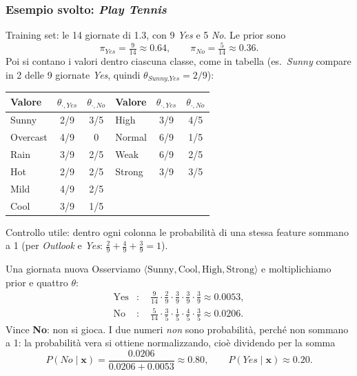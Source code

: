 \documentclass[12pt]{extarticle}
\begin{document}
\subsubsection{Esempio svolto: \textit{Play Tennis}}

\noindent Training set: le 14 giornate di 1.3, con 9 \textit{Yes} e 5 \textit{No}. Le prior sono
\[
\pi_{\textit{Yes}} = \tfrac{9}{14}\approx 0.64,
\qquad
\pi_{\textit{No}} = \tfrac{5}{14}\approx 0.36 .
\]
Poi si contano i valori dentro ciascuna classe, come in tabella (es.\ \textit{Sunny} compare in 2 delle 9 giornate \textit{Yes}, quindi $\theta_{\textit{Sunny},\textit{Yes}}=2/9$):

\begin{center}
\small
\begin{tabular}{lcc|lcc}
    \toprule
    \textbf{Valore} & $\theta_{\cdot, Yes}$ & $\theta_{\cdot, No}$ & \textbf{Valore} & $\theta_{\cdot, Yes}$ & $\theta_{\cdot, No}$ \\
    \midrule
    Sunny    & 2/9 & 3/5 & High   & 3/9 & 4/5 \\
    Overcast & 4/9 & 0   & Normal & 6/9 & 1/5 \\
    Rain     & 3/9 & 2/5 & Weak   & 6/9 & 2/5 \\
    Hot      & 2/9 & 2/5 & Strong & 3/9 & 3/5 \\
    Mild     & 4/9 & 2/5 & & & \\
    Cool     & 3/9 & 1/5 & & & \\
    \bottomrule
\end{tabular}
\end{center}
Controllo utile: dentro ogni colonna le probabilità di una stessa feature sommano a 1 (per \textit{Outlook} e \textit{Yes}: $\tfrac29+\tfrac49+\tfrac39=1$).

\begin{esempiobox}{Una giornata nuova}
Osserviamo $\langle \text{Sunny}, \text{Cool}, \text{High}, \text{Strong} \rangle$ e moltiplichiamo prior e quattro $\theta$:
\begin{align*}
\text{Yes}&:\quad \tfrac{9}{14}\cdot\tfrac{2}{9}\cdot\tfrac{3}{9}\cdot\tfrac{3}{9}\cdot\tfrac{3}{9} \approx 0.0053,\\
\text{No}&:\quad \tfrac{5}{14}\cdot\tfrac{3}{5}\cdot\tfrac{1}{5}\cdot\tfrac{4}{5}\cdot\tfrac{3}{5} \approx 0.0206 .
\end{align*}
Vince \textbf{No}: non si gioca. I due numeri \emph{non} sono probabilità, perché non sommano a 1: la probabilità vera si ottiene normalizzando, cioè dividendo per la somma
\[
P(\textit{No}\mid\mathbf{x}) = \frac{0.0206}{0.0206+0.0053}\approx 0.80,
\qquad
P(\textit{Yes}\mid\mathbf{x})\approx 0.20 .
\]
\end{esempiobox}
\end{document}
